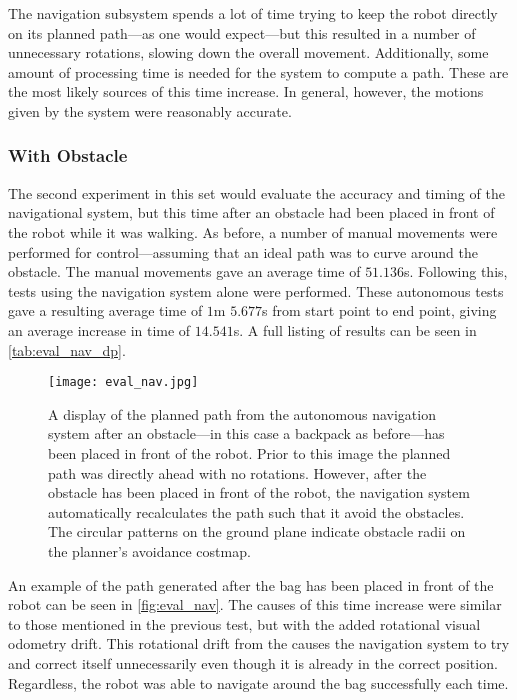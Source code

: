 The navigation subsystem spends a lot of time trying to keep the robot directly on its planned path---as one would expect---but this resulted in a number of unnecessary rotations, slowing down the overall movement. Additionally, some amount of processing time is needed for the system to compute a path. These are the most likely sources of this time increase. In general, however, the motions given by the system were reasonably accurate.

\subsubsection{With Obstacle}

The second experiment in this set would evaluate the accuracy and timing of the navigational system, but this time after an obstacle had been placed in front of the robot while it was walking. As before, a number of manual movements were performed for control---assuming that an ideal path was to curve around the obstacle. The manual movements gave an average time of $51.136$s. Following this, tests using the navigation system alone were performed. These autonomous tests gave a resulting average time of $1$m $5.677$s from start point to end point, giving an average increase in time of $14.541$s. A full listing of results can be seen in \autoref{tab:eval_nav_dp}.

\begin{figure}[h]
	\centering
	\texttt{[image: eval\_nav.jpg]}
	\caption{A display of the planned path from the autonomous navigation system after an obstacle---in this case a backpack as before---has been placed in front of the robot. Prior to this image the planned path was directly ahead with no rotations. However, after the obstacle has been placed in front of the robot, the navigation system automatically recalculates the path such that it avoid the obstacles. The circular patterns on the ground plane indicate obstacle radii on the planner's avoidance costmap.}
	\label{fig:eval_nav}
\end{figure}

An example of the path generated after the bag has been placed in front of the robot can be seen in \autoref{fig:eval_nav}. The causes of this time increase were similar to those mentioned in the previous test, but with the added rotational visual odometry drift. This rotational drift from the causes the navigation system to try and correct itself unnecessarily even though it is already in the correct position. Regardless, the robot was able to navigate around the bag successfully each time.

